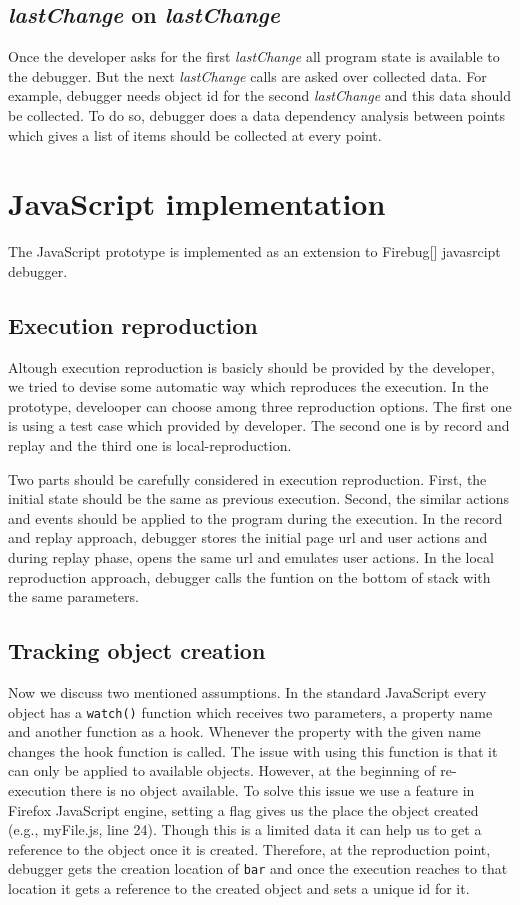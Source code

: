 \documentclass[preprint]{sigplanconf}
\begin{document}
\subsection{\textit{lastChange} on \textit{lastChange}}
Once the developer asks for the first \textit{lastChange} all program state is available to the debugger. But the next \textit{lastChange} calls are asked over collected data. For example, debugger needs object id for the second \textit{lastChange} and this data should be collected. To do so, debugger does a data dependency analysis between points which gives a list of items should be collected at every point.

\section{JavaScript implementation}
The JavaScript prototype is implemented as an extension to Firebug[] javasrcipt debugger. 

\subsection{Execution reproduction}
Altough execution reproduction is basicly should be provided by the developer, we tried to devise some automatic way which reproduces the execution. In the prototype, develooper can choose among three reproduction options. The first one is using a test case which provided by developer. The second one is by record and replay and the third one is local-reproduction.

Two parts should be carefully considered in execution reproduction. First, the initial state should be the same as previous execution. Second, the similar actions and events should be applied to the program during the execution. In the record and replay approach, debugger stores the initial page url and user actions and during replay phase, opens the same url and emulates user actions. 
In the local reproduction approach, debugger calls the funtion on the bottom of stack with the same parameters.

\subsection{Tracking object creation}
Now we discuss two mentioned assumptions. In the standard JavaScript every object has a \texttt{watch()} function which receives two parameters, a property name and another function as a hook. Whenever the property with the given name changes the hook function is called. The issue with using this function is that it can only be applied to available objects. However, at the beginning of re-execution there is no object available. To solve this issue we use a feature in Firefox JavaScript engine, setting a flag gives us the place the object created (e.g., myFile.js, line 24). Though this is a limited data it can help us to get a reference to the object once it is created. Therefore, at the reproduction point, debugger gets the creation location of \texttt{bar} and once the execution reaches to that location it gets a reference to the created object and sets a unique id for it.
\end{document}
